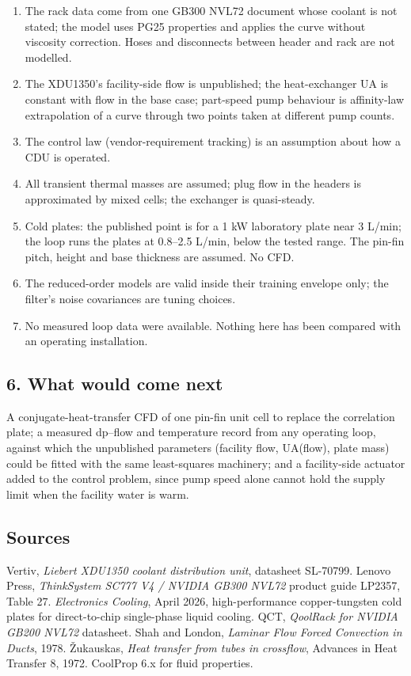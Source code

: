 \documentclass[
  10pt,
]{article}
\providecommand{\tightlist}{%
  \setlength{\itemsep}{0pt}\setlength{\parskip}{0pt}}
\begin{document}
\begin{enumerate}
\def\labelenumi{\arabic{enumi}.}
\tightlist
\item
  The rack data come from one GB300 NVL72 document whose coolant is not stated; the model uses PG25 properties and applies the curve without viscosity correction. Hoses and disconnects between header and rack are not modelled.
\item
  The XDU1350's facility-side flow is unpublished; the heat-exchanger UA is constant with flow in the base case; part-speed pump behaviour is affinity-law extrapolation of a curve through two points taken at different pump counts.
\item
  The control law (vendor-requirement tracking) is an assumption about how a CDU is operated.
\item
  All transient thermal masses are assumed; plug flow in the headers is approximated by mixed cells; the exchanger is quasi-steady.
\item
  Cold plates: the published point is for a 1 kW laboratory plate near 3 L/min; the loop runs the plates at 0.8--2.5 L/min, below the tested range. The pin-fin pitch, height and base thickness are assumed. No CFD.
\item
  The reduced-order models are valid inside their training envelope only; the filter's noise covariances are tuning choices.
\item
  No measured loop data were available. Nothing here has been compared with an operating installation.
\end{enumerate}

\hypertarget{what-would-come-next}{%
\subsection{6. What would come next}\label{what-would-come-next}}

A conjugate-heat-transfer CFD of one pin-fin unit cell to replace the correlation plate; a measured dp--flow and temperature record from any operating loop, against which the unpublished parameters (facility flow, UA(flow), plate mass) could be fitted with the same least-squares machinery; and a facility-side actuator added to the control problem, since pump speed alone cannot hold the supply limit when the facility water is warm.

\hypertarget{sources}{%
\subsection{Sources}\label{sources}}

Vertiv, \emph{Liebert XDU1350 coolant distribution unit}, datasheet SL-70799. Lenovo Press, \emph{ThinkSystem SC777 V4 / NVIDIA GB300 NVL72} product guide LP2357, Table 27. \emph{Electronics Cooling}, April 2026, high-performance copper-tungsten cold plates for direct-to-chip single-phase liquid cooling. QCT, \emph{QoolRack for NVIDIA GB200 NVL72} datasheet. Shah and London, \emph{Laminar Flow Forced Convection in Ducts}, 1978. Žukauskas, \emph{Heat transfer from tubes in crossflow}, Advances in Heat Transfer 8, 1972. CoolProp 6.x for fluid properties.
\end{document}
